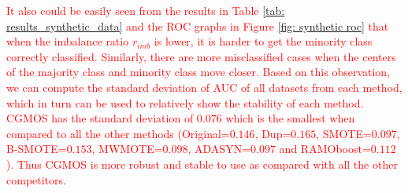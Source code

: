 \documentclass[10pt,journal,compsoc]{IEEEtran}
\begin{document}
\textcolor{red}{It also could be easily seen from the results in Table \ref{tab: results_synthetic_data} and the ROC graphs in Figure \ref{fig: synthetic roc} that when the imbalance ratio $r_{imb}$ is lower, it is harder to get the minority class correctly classified. Similarly, there are more misclassified cases when the centers of the majority class and minority class move closer. Based on this observation, we can compute the standard deviation of AUC of all datasets from each method, which in turn can be used to relatively show the stability of each method. CGMOS has the standard deviation of $0.076$ which is the smallest when compared to all the other methods (Original=$0.146$, Dup=$0.165$, SMOTE=$0.097$, B-SMOTE=$0.153$, MWMOTE=$0.098$, ADASYN=$0.097$ and RAMOboost=$0.112$). Thus CGMOS is more robust and stable to use as compared with all the other competitors.}
\end{document}
